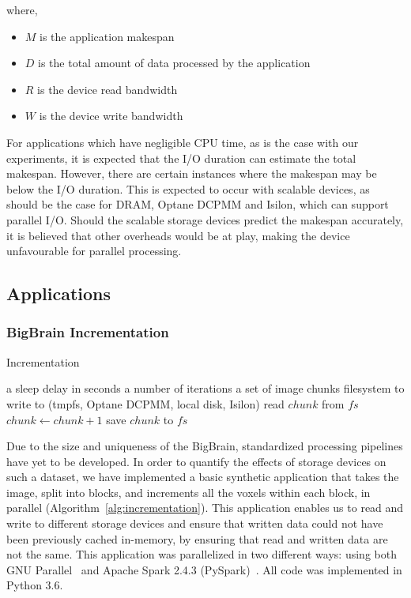 \documentclass[conference]{IEEEtran}
\newcommand{\Desc}[2]{\State \makebox[2em][l]{#1}#2}
\newcommand{\bigbrain}{BigBrain\xspace}
\begin{document}
where,
\begin{itemize}
        \item $M$ is the application makespan
        \item $D$ is the total amount of data processed by the application
        \item $R$ is the device read bandwidth
        \item $W$ is the device write bandwidth
\end{itemize}

For applications which have negligible CPU time, as is the case with our experiments, 
it is expected that the I/O duration can estimate the total makespan. However, there
are certain instances where the makespan may be below the I/O duration. This is expected
to occur with scalable devices, as should be the
case for DRAM, Optane DCPMM and Isilon, which can support parallel I/O. Should the
scalable storage devices predict the makespan accurately, it is believed that other overheads
would be at play, making the device unfavourable for parallel processing.

\subsection{Applications}
\subsubsection{ \bigbrain Incrementation}

\begin{algorithm}\caption{Incrementation}\label{alg:incrementation}
    \begin{algorithmic}[1]
    \Input
        \Desc{$x$}{a sleep delay in seconds}
        \Desc{$n$}{a number of iterations}
        \Desc{$C$}{a set of image chunks}
        \Desc{$fs$}{filesystem to write to (tmpfs, Optane DCPMM, local disk, Isilon)}
    \EndInput
        \State read $chunk$ from $fs$
        \State $chunk\gets chunk+1$
        \State save $chunk$ to $fs$
    \EndFor
    \end{algorithmic}
\end{algorithm}  

Due to the size and uniqueness of the \bigbrain, standardized processing pipelines
have yet to be developed. In order to quantify the effects of storage devices
on such a dataset, we have implemented a basic synthetic application that takes 
the image, split into blocks, and increments all the voxels within each block, in parallel (Algorithm~\ref{alg:incrementation}).
This application
enables us to read and write to different storage devices and ensure that written
data could not have been previously cached
in-memory, by ensuring that read and written data are not the same. This application
was parallelized in two different ways: using both GNU Parallel~\cite{gnuparallel} and Apache Spark 2.4.3 (PySpark)~\cite{spark}. 
All code was implemented in Python 3.6.
\end{document}
